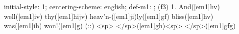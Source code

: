 initial-style: 1;
centering-scheme: english;
def-m1: \grealign;
(f3) 1. And([em1]hv) well([em1]iv) thy([em1]hijv) heav'n-([em1]ji)ly([em1]gf) bliss([em1]hv) was([em1]ih) won!([em1]g) (::) <sp> </sp>([em1]gh)<sp> </sp>([em1]gfg)
